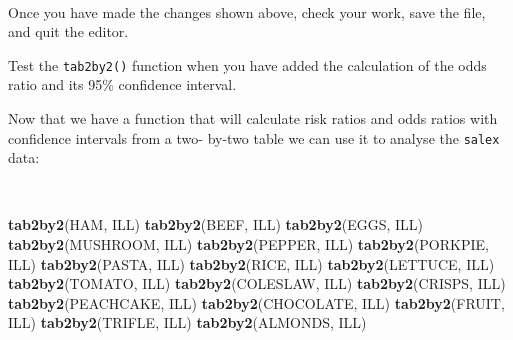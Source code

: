 \documentclass[12pt,a4paper]{book}
\newenvironment{Shaded}{\begin{snugshade}}{\end{snugshade}}
\newcommand{\KeywordTok}[1]{\textcolor[rgb]{0.13,0.29,0.53}{\textbf{#1}}}
\newcommand{\CharTok}[1]{\textcolor[rgb]{0.31,0.60,0.02}{#1}}
\newcommand{\StringTok}[1]{\textcolor[rgb]{0.31,0.60,0.02}{#1}}
\newcommand{\OperatorTok}[1]{\textcolor[rgb]{0.81,0.36,0.00}{\textbf{#1}}}
\newcommand{\NormalTok}[1]{#1}
\theoremstyle{definition}
\theoremstyle{definition}
\theoremstyle{definition}
\theoremstyle{remark}
\begin{document}
\begin{Shaded}
\end{Shaded}

~

Once you have made the changes shown above, check your work, save the
file, and quit the editor.

\newpage

Test the \texttt{tab2by2()} function when you have added the calculation
of the odds ratio and its 95\% confidence interval.

Now that we have a function that will calculate risk ratios and odds
ratios with confidence intervals from a two- by-two table we can use it
to analyse the \texttt{salex} data:

~

\begin{Shaded}
\begin{Highlighting}[]
\KeywordTok{tab2by2}\NormalTok{(HAM, ILL)}
\KeywordTok{tab2by2}\NormalTok{(BEEF, ILL)}
\KeywordTok{tab2by2}\NormalTok{(EGGS, ILL)}
\KeywordTok{tab2by2}\NormalTok{(MUSHROOM, ILL)}
\KeywordTok{tab2by2}\NormalTok{(PEPPER, ILL)}
\KeywordTok{tab2by2}\NormalTok{(PORKPIE, ILL)}
\KeywordTok{tab2by2}\NormalTok{(PASTA, ILL)}
\KeywordTok{tab2by2}\NormalTok{(RICE, ILL)}
\KeywordTok{tab2by2}\NormalTok{(LETTUCE, ILL)}
\KeywordTok{tab2by2}\NormalTok{(TOMATO, ILL)}
\KeywordTok{tab2by2}\NormalTok{(COLESLAW, ILL)}
\KeywordTok{tab2by2}\NormalTok{(CRISPS, ILL)}
\KeywordTok{tab2by2}\NormalTok{(PEACHCAKE, ILL)}
\KeywordTok{tab2by2}\NormalTok{(CHOCOLATE, ILL)}
\KeywordTok{tab2by2}\NormalTok{(FRUIT, ILL)}
\KeywordTok{tab2by2}\NormalTok{(TRIFLE, ILL)}
\KeywordTok{tab2by2}\NormalTok{(ALMONDS, ILL)}
\end{Highlighting}
\end{Shaded}
\end{document}
